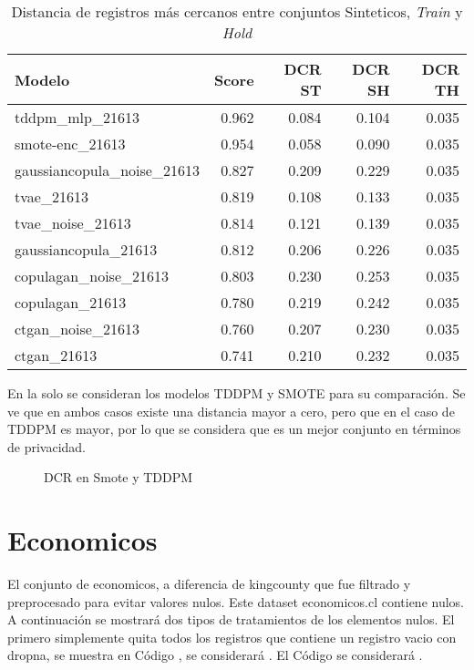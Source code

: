 \begin{table}[H]
    \centering
    \caption{Distancia de registros más cercanos entre conjuntos Sinteticos, \emph{Train} y \emph{Hold}}
    \label{tab-dcr}
    \begin{tabular}{|l|r|r|r|r|}
        \hline
        \rowcolor[gray]{0.8}
        Modelo & \textbf{Score}     & DCR ST & DCR SH & DCR TH \\ \hline
        tddpm\_mlp\_21613           & 0.962 & 0.084 & 0.104 & 0.035 \\ \hline
        smote-enc\_21613            & 0.954 & 0.058 & 0.090 & 0.035 \\ \hline
        gaussiancopula\_noise\_21613& 0.827 & 0.209 & 0.229 & 0.035 \\ \hline
        tvae\_21613                 & 0.819 & 0.108 & 0.133 & 0.035 \\ \hline
        tvae\_noise\_21613          & 0.814 & 0.121 & 0.139 & 0.035 \\ \hline
        gaussiancopula\_21613       & 0.812 & 0.206 & 0.226 & 0.035 \\ \hline
        copulagan\_noise\_21613     & 0.803 & 0.230 & 0.253 & 0.035 \\ \hline
        copulagan\_21613            & 0.780 & 0.219 & 0.242 & 0.035 \\ \hline
        ctgan\_noise\_21613         & 0.760 & 0.207 & 0.230 & 0.035 \\ \hline
        ctgan\_21613                & 0.741 & 0.210 & 0.232 & 0.035 \\ \hline
    \end{tabular}
\end{table}

En la  solo se consideran los modelos TDDPM y SMOTE para su comparación. Se ve que en ambos casos existe una distancia mayor a cero, pero que en el caso de TDDPM es mayor, por lo que se considera que es un mejor conjunto en términos de privacidad.
\begin{figure}[H]
    \centering
    
    \caption{DCR en Smote y TDDPM}
    \label{top2-dcr}
\end{figure}

\newpage
\section{Economicos}
El conjunto de economicos, a diferencia de kingcounty que fue filtrado y preprocesado para evitar valores nulos. Este dataset economicos.cl contiene nulos. A continuación se mostrará dos tipos de tratamientos de los elementos nulos. El primero simplemente quita todos los registros que contiene un registro vacio con dropna, se muestra en Código , se considerará . El Código  se considerará .


